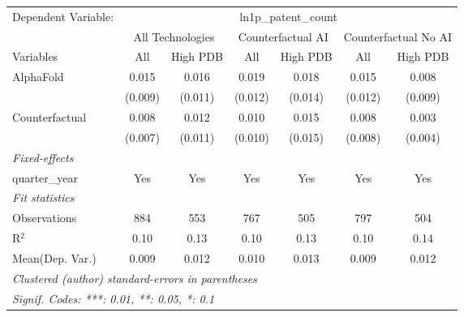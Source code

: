 \begingroup
\centering
\begin{tabular}{lcccccc}
   \tabularnewline \midrule \midrule
   Dependent Variable: & \multicolumn{6}{c}{ln1p\_patent\_count}\\
 & \multicolumn{2}{c}{All Technologies} & \multicolumn{2}{c}{Counterfactual AI} & \multicolumn{2}{c}{Counterfactual No AI} \\
\cmidrule(lr){1-1}\cmidrule(lr){2-3} \cmidrule(lr){4-5} \cmidrule(lr){6-7}
Variables & \multicolumn{1}{c}{All} & \multicolumn{1}{c}{High PDB} & \multicolumn{1}{c}{All} & \multicolumn{1}{c}{High PDB} & \multicolumn{1}{c}{All} & \multicolumn{1}{c}{High PDB} \\
\cmidrule(lr){1-1}\cmidrule(lr){2-2} \cmidrule(lr){3-3} \cmidrule(lr){4-4} \cmidrule(lr){5-5} \cmidrule(lr){6-6} \cmidrule(lr){7-7}
   AlphaFold      & 0.015   & 0.016   & 0.019   & 0.018   & 0.015   & 0.008\\   
                  & (0.009) & (0.011) & (0.012) & (0.014) & (0.012) & (0.009)\\   
   Counterfactual & 0.008   & 0.012   & 0.010   & 0.015   & 0.008   & 0.003\\   
                  & (0.007) & (0.011) & (0.010) & (0.015) & (0.008) & (0.004)\\   
   \midrule
   \emph{Fixed-effects}\\
   quarter\_year  & Yes     & Yes     & Yes     & Yes     & Yes     & Yes\\  
   \midrule
   \emph{Fit statistics}\\
   Observations   & 884     & 553     & 767     & 505     & 797     & 504\\  
   R$^2$          & 0.10    & 0.13    & 0.10    & 0.13    & 0.10    & 0.14\\  
Mean(Dep. Var.) & 0.009 & 0.012 & 0.010 & 0.013 & 0.009 & 0.012 \\
   \midrule \midrule
   \multicolumn{7}{l}{\emph{Clustered (author) standard-errors in parentheses}}\\
   \multicolumn{7}{l}{\emph{Signif. Codes: ***: 0.01, **: 0.05, *: 0.1}}\\
\end{tabular}
\par\endgroup
